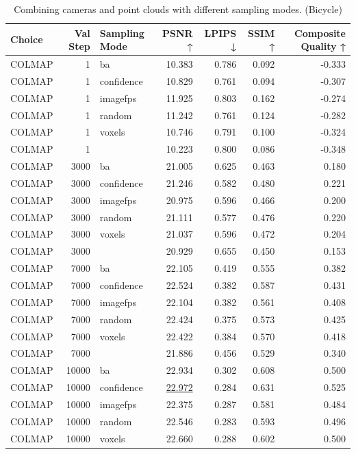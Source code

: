 \begin{table}[H]
\caption{Combining cameras and point clouds with different sampling modes. (Bicycle)}
\label{tab:07_combined_sampling_mode_single_bicycle}
\small
\begin{tabular}{lrlrrrr}
\toprule
Choice & Val Step & Sampling Mode & PSNR ↑ & LPIPS ↓ & SSIM ↑ & Composite Quality ↑ \\
\midrule
COLMAP & 1 & ba & 10.383 & 0.786 & 0.092 & -0.333 \\
COLMAP & 1 & confidence & 10.829 & 0.761 & 0.094 & -0.307 \\
COLMAP & 1 & imagefps & 11.925 & 0.803 & 0.162 & -0.274 \\
COLMAP & 1 & random & 11.242 & 0.761 & 0.124 & -0.282 \\
COLMAP & 1 & voxels & 10.746 & 0.791 & 0.100 & -0.324 \\
COLMAP & 1 &  & 10.223 & 0.800 & 0.086 & -0.348 \\
COLMAP & 3000 & ba & 21.005 & 0.625 & 0.463 & 0.180 \\
COLMAP & 3000 & confidence & 21.246 & 0.582 & 0.480 & 0.221 \\
COLMAP & 3000 & imagefps & 20.975 & 0.596 & 0.466 & 0.200 \\
COLMAP & 3000 & random & 21.111 & 0.577 & 0.476 & 0.220 \\
COLMAP & 3000 & voxels & 21.037 & 0.596 & 0.472 & 0.204 \\
COLMAP & 3000 &  & 20.929 & 0.655 & 0.450 & 0.153 \\
COLMAP & 7000 & ba & 22.105 & 0.419 & 0.555 & 0.382 \\
COLMAP & 7000 & confidence & 22.524 & 0.382 & 0.587 & 0.431 \\
COLMAP & 7000 & imagefps & 22.104 & 0.382 & 0.561 & 0.408 \\
COLMAP & 7000 & random & 22.424 & 0.375 & 0.573 & 0.425 \\
COLMAP & 7000 & voxels & 22.422 & 0.384 & 0.570 & 0.418 \\
COLMAP & 7000 &  & 21.886 & 0.456 & 0.529 & 0.340 \\
COLMAP & 10000 & ba & 22.934 & 0.302 & 0.608 & 0.500 \\
COLMAP & 10000 & confidence & \underline{22.972} & 0.284 & 0.631 & 0.525 \\
COLMAP & 10000 & imagefps & 22.375 & 0.287 & 0.581 & 0.484 \\
COLMAP & 10000 & random & 22.546 & 0.283 & 0.593 & 0.496 \\
COLMAP & 10000 & voxels & 22.660 & 0.288 & 0.602 & 0.500 \\

\end{tabular}
\end{table}
